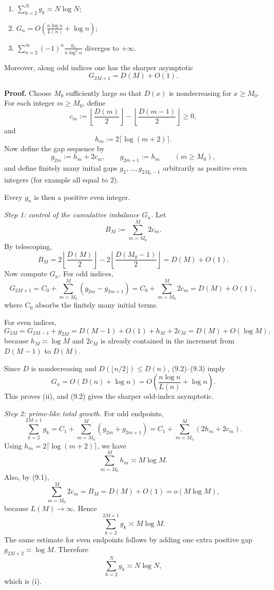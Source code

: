 \begin{enumerate}
\item[(i)] \(\displaystyle \sum_{k=2}^N g_k \asymp N\log N\);

\item[(ii)] \(\displaystyle G_n = O\!\left(\frac{n\log n}{L(n)}+\log n\right)\);

\item[(iii)] \(\displaystyle \sum_{n=2}^\infty (-1)^n \frac{g_n}{n\log^2 n}\) diverges to \(+\infty\).
\end{enumerate}

Moreover, along odd indices one has the sharper asymptotic
\[
G_{2M+1}=D(M)+O(1).
\]

\textbf{Proof.}
Choose \(M_0\) sufficiently large so that \(D(x)\) is nondecreasing for \(x\ge M_0\).
For each integer \(m\ge M_0\), define
\[
c_m:=\left\lfloor \frac{D(m)}{2}\right\rfloor - \left\lfloor \frac{D(m-1)}{2}\right\rfloor \ge 0,
\]
and
\[
h_m:=2\lceil \log(m+2)\rceil.
\]
Now define the gap sequence by
\[
g_{2m}:=h_m+2c_m,
\qquad
g_{2m+1}:=h_m
\qquad (m\ge M_0),
\]
and define finitely many initial gaps \(g_2,\dots,g_{2M_0-1}\) arbitrarily as positive even integers (for example all equal to \(2\)).

Every \(g_n\) is then a positive even integer.

\medskip

\emph{Step 1: control of the cumulative imbalance \(G_n\).}
Let
\[
B_M:=\sum_{m=M_0}^M 2c_m.
\]
By telescoping,
\[
B_M
=
2\left\lfloor \frac{D(M)}{2}\right\rfloor
-
2\left\lfloor \frac{D(M_0-1)}{2}\right\rfloor
=
D(M)+O(1).
\tag{9.1}
\]
Now compute \(G_n\).
For odd indices,
\[
G_{2M+1}
=
C_0+\sum_{m=M_0}^M (g_{2m}-g_{2m+1})
=
C_0+\sum_{m=M_0}^M 2c_m
=
D(M)+O(1),
\tag{9.2}
\]
where \(C_0\) absorbs the finitely many initial terms.

For even indices,
\[
G_{2M}
=
G_{2M-1}+g_{2M}
=
D(M-1)+O(1)+h_M+2c_M
=
D(M)+O(\log M),
\tag{9.3}
\]
because \(h_M\asymp \log M\) and \(2c_M\) is already contained in the increment from \(D(M-1)\) to \(D(M)\).

Since \(D\) is nondecreasing and \(D(\lfloor n/2\rfloor)\le D(n)\), (9.2)--(9.3) imply
\[
G_n = O(D(n)+\log n)
=
O\!\left(\frac{n\log n}{L(n)}+\log n\right).
\]
This proves (ii), and (9.2) gives the sharper odd-index asymptotic.

\medskip

\emph{Step 2: prime-like total growth.}
For odd endpoints,
\[
\sum_{k=2}^{2M+1} g_k
=
C_1+\sum_{m=M_0}^M (g_{2m}+g_{2m+1})
=
C_1+\sum_{m=M_0}^M (2h_m+2c_m).
\]
Using \(h_m=2\lceil \log(m+2)\rceil\), we have
\[
\sum_{m=M_0}^M h_m \asymp M\log M.
\]
Also, by (9.1),
\[
\sum_{m=M_0}^M 2c_m = B_M = D(M)+O(1) = o(M\log M),
\]
because \(L(M)\to\infty\).
Hence
\[
\sum_{k=2}^{2M+1} g_k \asymp M\log M.
\]
The same estimate for even endpoints follows by adding one extra positive gap \(g_{2M+2}\asymp \log M\).
Therefore
\[
\sum_{k=2}^N g_k \asymp N\log N,
\]
which is (i).

